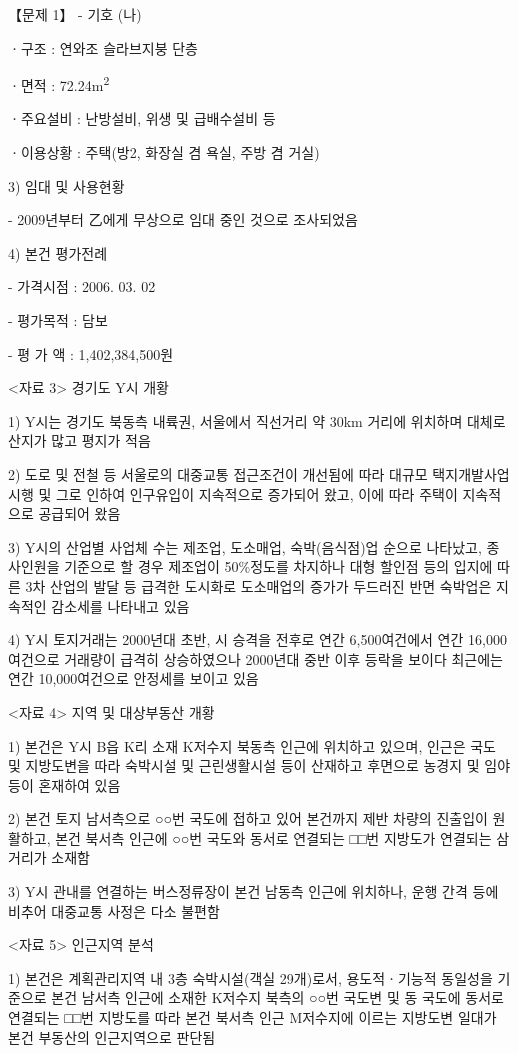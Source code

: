 \begin{longquestion}{【문제 1】}
- 기호 (나) \par
ㆍ구조 : 연와조 슬라브지붕 단층 \par
ㆍ면적 : 72.24m\textsuperscript{2} \par
ㆍ주요설비 : 난방설비, 위생 및 급배수설비 등 \par
ㆍ이용상황 : 주택(방2, 화장실 겸 욕실, 주방 겸 거실) \par
3) 임대 및 사용현황 \par
- 2009년부터 乙에게 무상으로 임대 중인 것으로 조사되었음 \par
4) 본건 평가전례 \par
- 가격시점 : 2006. 03. 02 \par
- 평가목적 : 담보 \par
- 평 가 액 : 1,402,384,500원 \par
<자료 3> 경기도 Y시 개황 \par
1) Y시는 경기도 북동측 내륙권, 서울에서 직선거리 약 30km 거리에 위치하며 대체로 산지가 많고 평지가 적음 \par
2) 도로 및 전철 등 서울로의 대중교통 접근조건이 개선됨에 따라 대규모 택지개발사업 시행 및 그로 인하여 인구유입이 지속적으로 증가되어 왔고, 이에 따라 주택이 지속적으로 공급되어 왔음 \par
3) Y시의 산업별 사업체 수는 제조업, 도소매업, 숙박(음식점)업 순으로 나타났고, 종사인원을 기준으로 할 경우 제조업이 50\%정도를 차지하나 대형 할인점 등의 입지에 따른 3차 산업의 발달 등 급격한 도시화로 도소매업의 증가가 두드러진 반면 숙박업은 지속적인 감소세를 나타내고 있음 \par
4) Y시 토지거래는 2000년대 초반, 시 승격을 전후로 연간 6,500여건에서 연간 16,000여건으로 거래량이 급격히 상승하였으나 2000년대 중반 이후 등락을 보이다 최근에는 연간 10,000여건으로 안정세를 보이고 있음 \par
<자료 4> 지역 및 대상부동산 개황 \par
1) 본건은 Y시 B읍 K리 소재 K저수지 북동측 인근에 위치하고 있으며, 인근은 국도 및 지방도변을 따라 숙박시설 및 근린생활시설 등이 산재하고 후면으로 농경지 및 임야 등이 혼재하여 있음 \par
2) 본건 토지 남서측으로 ○○번 국도에 접하고 있어 본건까지 제반 차량의 진출입이 원활하고, 본건 북서측 인근에 ○○번 국도와 동서로 연결되는 □□번 지방도가 연결되는 삼거리가 소재함 \par
3) Y시 관내를 연결하는 버스정류장이 본건 남동측 인근에 위치하나, 운행 간격 등에 비추어 대중교통 사정은 다소 불편함 \par
<자료 5> 인근지역 분석 \par
1) 본건은 계획관리지역 내 3층 숙박시설(객실 29개)로서, 용도적ㆍ기능적 동일성을 기준으로 본건 남서측 인근에 소재한 K저수지 북측의 ○○번 국도변 및 동 국도에 동서로 연결되는 □□번 지방도를 따라 본건 북서측 인근 M저수지에 이르는 지방도변 일대가 본건 부동산의 인근지역으로 판단됨 \par

\end{longquestion}
